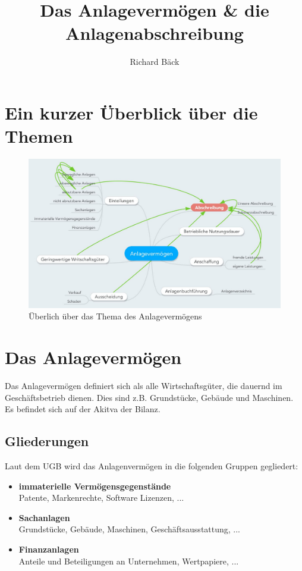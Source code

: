 \documentclass[a4paper,10pt]{report}
\title{Das Anlagevermögen \& die Anlagenabschreibung}
\author{Richard Bäck}
\begin{document}
\maketitle
\tableofcontents
\pagebreak
\listoffigures
\pagebreak
\listoftables
\pagebreak

\chapter{Ein kurzer Überblick über die Themen}
\begin{figure}[ht]
\centering
\includegraphics[width=18cm]{Bilder/Ueberblick}
\caption{Überlich über das Thema des Anlagevermögens}
\end{figure}


\chapter{Das Anlagevermögen}
\thispagestyle{fancy}
Das Anlagevermögen definiert sich als alle Wirtschaftsgüter, die
dauernd im Geschäftsbetrieb dienen. Dies sind z.B. Grundstücke,
Gebäude und Maschinen. Es befindet sich auf der Akitva der
Bilanz.

\section{Gliederungen}
Laut dem UGB wird das Anlagenvermögen in die folgenden Gruppen
gegliedert:
\begin{itemize}
  \item {
      \textbf{immaterielle Vermögensgegenstände}\\
      Patente, Markenrechte, Software Lizenzen, ...
    }
  \item {
      \textbf{Sachanlagen}\\
      Grundstücke, Gebäude, Maschinen, Geschäftsausstattung, ...
    }
  \item {
      \textbf{Finanzanlagen}\\
      Anteile und Beteiligungen an Unternehmen, Wertpapiere, ...
    }
\end{itemize}
\end{document}
